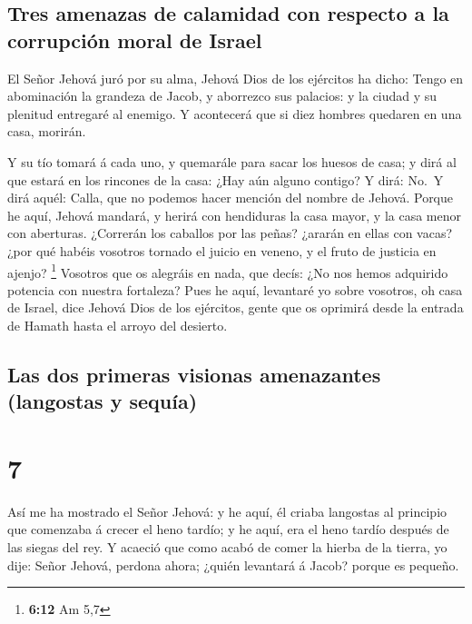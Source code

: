 \hypertarget{tres-amenazas-de-calamidad-con-respecto-a-la-corrupciuxf3n-moral-de-israel}{%
\subsection{Tres amenazas de calamidad con respecto a la corrupción
moral de
Israel}\label{tres-amenazas-de-calamidad-con-respecto-a-la-corrupciuxf3n-moral-de-israel}}

 El Señor Jehová juró por su alma, Jehová Dios de los
ejércitos ha dicho: Tengo en abominación la grandeza de Jacob, y
aborrezco sus palacios: y la ciudad y su plenitud entregaré al enemigo.
 Y acontecerá que si diez hombres quedaren en una casa,
morirán.

 Y su tío tomará á cada uno, y quemarále para sacar los
huesos de casa; y dirá al que estará en los rincones de la casa: ¿Hay
aún alguno contigo? Y dirá: No.~Y dirá aquél: Calla, que no podemos
hacer mención del nombre de Jehová.  Porque he aquí, Jehová
mandará, y herirá con hendiduras la casa mayor, y la casa menor con
aberturas.  ¿Correrán los caballos por las peñas? ¿ararán
en ellas con vacas? ¿por qué habéis vosotros tornado el juicio en
veneno, y el fruto de justicia en ajenjo? \footnote{\textbf{6:12} Am 5,7}
 Vosotros que os alegráis en nada, que decís: ¿No nos hemos
adquirido potencia con nuestra fortaleza?  Pues he aquí,
levantaré yo sobre vosotros, oh casa de Israel, dice Jehová Dios de los
ejércitos, gente que os oprimirá desde la entrada de Hamath hasta el
arroyo del desierto.

\hypertarget{las-dos-primeras-visionas-amenazantes-langostas-y-sequuxeda}{%
\subsection{Las dos primeras visionas amenazantes (langostas y
sequía)}\label{las-dos-primeras-visionas-amenazantes-langostas-y-sequuxeda}}

\hypertarget{section-6}{%
\section{7}\label{section-6}}

 Así me ha mostrado el Señor Jehová: y he aquí, él criaba
langostas al principio que comenzaba á crecer el heno tardío; y he aquí,
era el heno tardío después de las siegas del rey.  Y acaeció
que como acabó de comer la hierba de la tierra, yo dije: Señor Jehová,
perdona ahora; ¿quién levantará á Jacob? porque es pequeño.

